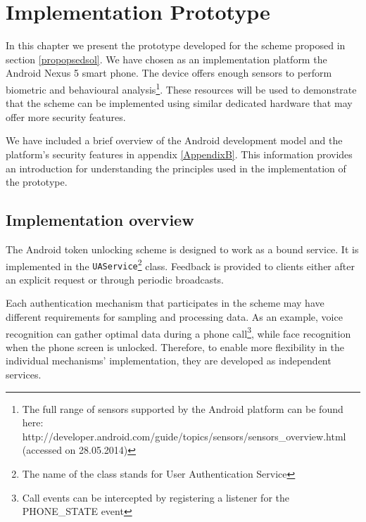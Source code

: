 
\chapter{Implementation Prototype} %

\label{Chapter5} %

In this chapter we present the prototype developed for the scheme proposed in section \ref{propopsedsol}. We have chosen as an implementation platform the Android Nexus 5 smart phone. The device offers enough sensors to perform biometric and behavioural analysis\footnote{The full range of sensors supported by the Android platform can be found here: http://developer.android.com/guide/topics/sensors/sensors\_overview.html (accessed on 28.05.2014)}. These resources will be used to demonstrate that the scheme can be implemented using similar dedicated hardware that may offer more security features.

We have included a brief overview of the Android development model and the platform's security features in appendix \ref{AppendixB}. This information provides an introduction for understanding the principles used in the implementation of the prototype.

\section{Implementation overview}
\label{impleoverview}
The Android token unlocking scheme is designed to work as a bound service. It is implemented in the {\tt UAService}\footnote{The name of the class stands for User Authentication Service} class. Feedback is provided to clients either after an explicit request or through periodic broadcasts.

Each authentication mechanism that participates in the scheme may have different requirements for sampling and processing data. As an example, voice recognition can gather optimal data during a phone call\footnote{Call events can be intercepted by registering a listener for the PHONE\_STATE event}, while face recognition when the phone screen is unlocked. Therefore, to enable more flexibility in the individual mechanisms' implementation, they are developed as independent services.

